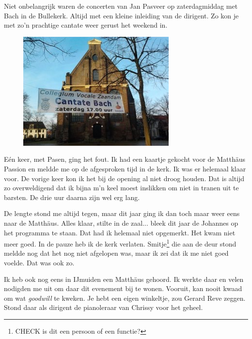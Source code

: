 \documentclass[10pt,twoside, openright]{memoir}
\begin{document}
Niet onbelangrijk waren de concerten van Jan Pasveer op zaterdagmiddag met Bach in de Bullekerk. Altijd met een kleine inleiding van de dirigent. Zo kon je met zo’n prachtige cantate weer gerust het weekend in.

\begin{figure}
\includegraphics[width=\textwidth]{img/ch31/Spandoek-cantate-klein}
\end{figure}

Eén keer, met Pasen, ging het fout. Ik had een kaartje gekocht voor de Matthäus Passion en meldde me op de afgesproken tijd in de kerk. Ik was er helemaal klaar voor. De vorige keer kon ik het bij de opening al niet droog houden. Dat is altijd zo overweldigend dat ik bijna m’n keel moest inslikken om niet in tranen uit te barsten. De drie uur daarna zijn wel erg lang. 

De lengte stond me altijd tegen, maar dit jaar ging ik dan toch maar weer eens naar de Matthäus. Alles klaar, stilte in de zaal... bleek dit jaar de Johannes op het programma te staan. Dat had ik helemaal niet opgemerkt. Het kwam niet meer goed. In de pauze heb ik de kerk verlaten. Smitje\footnote{CHECK is dit een persoon of een functie?} die aan de deur stond meldde nog dat het nog niet afgelopen was, maar ik zei dat ik me niet goed voelde. Dat was ook zo.


Ik heb ook nog eens in IJmuiden een Matthäus gehoord. Ik werkte daar en velen nodigden me uit om daar dit evenement bij te wonen. Vooruit, kan nooit kwaad om wat \emph{goodwill} te kweken. Je hebt een eigen winkeltje, zou Gerard Reve zeggen. Stond daar als dirigent de pianoleraar van Chrissy voor het geheel. 
\end{document}
